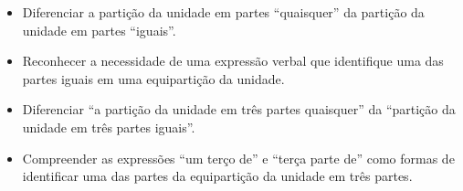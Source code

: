 \begin{multicols}{2}

\begin{objetivos}{}{}
\begin{itemize} %
    \item       Diferenciar a partição da unidade em partes ``quaisquer'' da partição da unidade em partes       ``iguais''. 
    \item       Reconhecer a necessidade de uma expressão verbal que identifique uma das partes iguais em uma equipartição da unidade.
    \item       Diferenciar ``a partição da unidade em três partes quaisquer'' da ``partição da unidade em três partes iguais''.
    \item       Compreender as expressões ``um terço de'' e ``terça parte de'' como formas de identificar uma das partes da equipartição da unidade em três partes.
\end{itemize} %
\end{objetivos}


\end{multicols}
